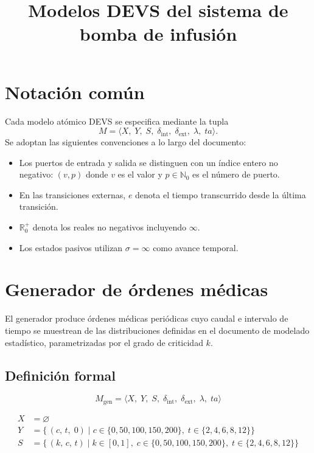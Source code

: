 \documentclass{article}
\title{Modelos DEVS del sistema de bomba de infusión}
\date{}
\newcommand{\dint}{\delta_{\mathrm{int}}}
\newcommand{\dext}{\delta_{\mathrm{ext}}}
\newcommand{\ta}{\mathit{ta}}
\begin{document}
\maketitle

\tableofcontents
\newpage

\section{Notación común}

Cada modelo atómico DEVS se especifica mediante la tupla
\[
  M = \langle X,\; Y,\; S,\; \dint,\; \dext,\; \lambda,\; \ta \rangle.
\]
Se adoptan las siguientes convenciones a lo largo del documento:

\begin{itemize}
  \item Los puertos de entrada y salida se distinguen con un índice entero
        no negativo: $(v, p)$ donde $v$ es el valor y $p \in \mathbb{N}_0$
        es el número de puerto.
  \item En las transiciones externas, $e$ denota el tiempo transcurrido desde
        la última transición.
  \item $\mathbb{R}_0^+$ denota los reales no negativos incluyendo $\infty$.
  \item Los estados pasivos utilizan $\sigma = \infty$ como avance temporal.
\end{itemize}

\section{Generador de órdenes médicas}

El generador produce órdenes médicas periódicas cuyo caudal e intervalo
de tiempo se muestrean de las distribuciones definidas en el documento
de modelado estadístico, parametrizadas por el grado de criticidad $k$.

\subsection{Definición formal}

\[
  M_{\mathrm{gen}} = \langle X,\; Y,\; S,\; \dint,\; \dext,\; \lambda,\; \ta \rangle
\]

\begin{align*}
  X &= \varnothing \\[4pt]
  Y &= \bigl\{\,(c,\,t,\;0)\;\big|\;
        c\in\{0,50,100,150,200\},\;
        t\in\{2,4,6,8,12\}\bigr\} \\[4pt]
  S &= \bigl\{\,(k,\,c,\,t)\;\big|\;
        k\in[0,1],\;
        c\in\{0,50,100,150,200\},\;
        t\in\{2,4,6,8,12\}\bigr\}
\end{align*}
\end{document}
